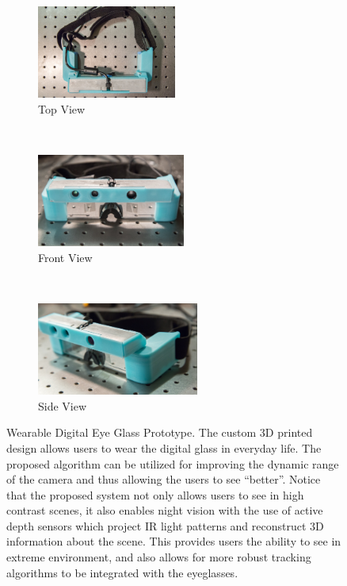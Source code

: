 \begin{figure}
\centering
\begin{subfigure}{.32\textwidth}
\centering
\includegraphics[height=1.2in]{ch4/diagrams/hdrglass/lowres/IMG_0257.jpg}
\caption{Top View}
\label{fig_third_case}
\end{subfigure}
~
\begin{subfigure}{.32\textwidth}
\centering
\includegraphics[height=1.2in]{ch4/diagrams/hdrglass/lowres/IMG_0263.jpg}
\caption{Front View}
\label{fig_second_case}
\end{subfigure}
~
\begin{subfigure}{.32\textwidth}
\centering
\includegraphics[height=1.2in]{ch4/diagrams/hdrglass/lowres/IMG_0258.jpg}
\caption{Side View}
\label{fig_first_case}
\end{subfigure}

\caption{Wearable Digital Eye Glass Prototype. The custom 3D printed design allows users to wear the digital glass in everyday life. The proposed algorithm can be utilized for improving the dynamic range of the camera and thus allowing the users to see ``better''. Notice that the proposed system not only allows users to see in high contrast scenes, it also enables night vision with the use of active depth sensors which project IR light patterns and reconstruct 3D information about the scene. This provides users the ability to see in extreme environment, and also allows for more robust tracking algorithms to be integrated with the eyeglasses.}
\label{fig_wearable_glass}
\end{figure}


